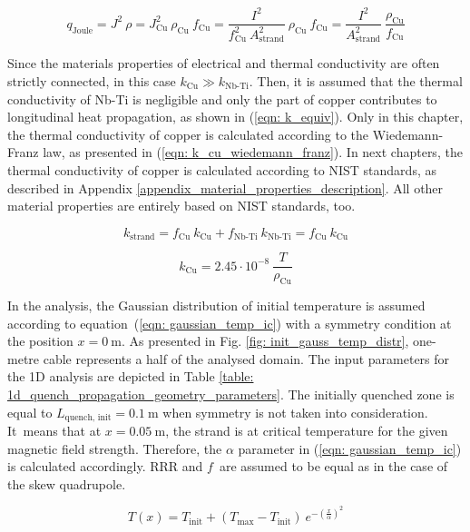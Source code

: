 \begin{equation}
    q_\text{Joule} = J^2~\rho = J_\text{Cu}^2~\rho_\text{Cu}~f_\text{Cu} = \frac{I^2}{f_\text{Cu}^2~A_\text{strand}^2}~\rho_\text{Cu}~f_\text{Cu} = \frac{I^2}{A_\text{strand}^2}~\frac{\rho_\text{Cu}}{f_\text{Cu}} 
    \label{eqn: p_dens_equiv}
\end{equation}

Since the materials properties of electrical and thermal conductivity are often strictly connected, in this case $k_\text{Cu} \gg k_\text{Nb-Ti}$. Then, it is assumed that the thermal conductivity of Nb-Ti is negligible and only the part of copper contributes to longitudinal heat propagation, as shown in (\ref{eqn: k_equiv}). Only in this chapter, the thermal conductivity of copper is calculated according to the Wiedemann-Franz law, as presented in (\ref{eqn: k_cu_wiedemann_franz}). In next chapters, the thermal conductivity of copper is calculated according to NIST standards, as described in Appendix \ref{appendix_material_properties_description}. All other material properties are entirely based on NIST standards, too.

\begin{equation}
    k_\text{strand} = f_\text{Cu} ~ k_\text{Cu} + f_\text{Nb-Ti} ~ k_\text{Nb-Ti} =  f_\text{Cu} ~ k_\text{Cu}
    \label{eqn: k_equiv}
\end{equation}

\begin{equation}
    k_\text{Cu} = 2.45 \cdot 10^{-8} ~ \frac{T}{\rho_\text{Cu}}
    \label{eqn: k_cu_wiedemann_franz}
\end{equation}

In the analysis, the Gaussian distribution of initial temperature is assumed according to equation~(\ref{eqn: gaussian_temp_ic}) with a symmetry condition at the position $x=0~\text{m}$. As presented in Fig. \ref{fig: init_gauss_temp_distr}, one-metre cable represents a half of the analysed domain. The input parameters for the 1D analysis are depicted in Table \ref{table: 1d_quench_propagation_geometry_parameters}. The initially quenched zone is equal to $L_\text{quench, init}= 0.1~\text{m}$ when symmetry is not taken into consideration. It~means that at $x=0.05~\text{m}$, the strand is at critical temperature for the given magnetic field strength. Therefore, the $\alpha$ parameter in (\ref{eqn: gaussian_temp_ic}) is calculated accordingly. RRR and $f$~are assumed to be equal as in the case of the skew quadrupole. 

\begin{equation}
    T(x) = T_\text{init} + (T_\text{max} - T_\text{init}) ~ e^{-(\frac{x}{\alpha})^2}
    \label{eqn: gaussian_temp_ic}
\end{equation}

